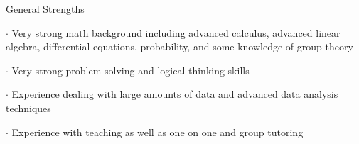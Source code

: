 \documentclass{resume} %
\begin{document}

\begin{rSection}{General Strengths}

\item $\cdot$ Very strong math background including advanced calculus, advanced linear algebra, differential equations, probability, and some knowledge of group theory
\item  $\cdot$ Very strong problem solving and logical thinking skills
\item  $\cdot$ Experience dealing with large amounts of data and advanced data analysis techniques
\item  $\cdot$ Experience with teaching as well as one on one and group tutoring


\end{rSection}

\end{document}
